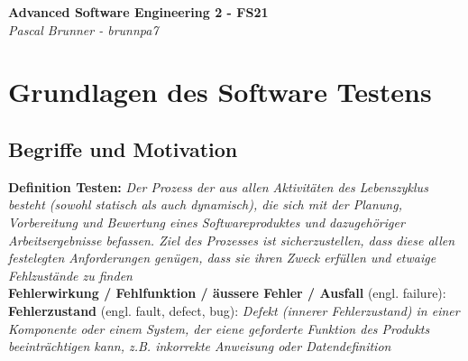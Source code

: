 \documentclass{report}
\newenvironment{Figure}
	{\par\medskip\noindent\minipage{\linewidth}}
	{\endminipage\par\medskip}
\theoremstyle{definition}
\theoremstyle{example}
\begin{document}
\begin{titlepage}
   \begin{center}
      \Large\textbf{Advanced Software Engineering 2 - FS21}\\
      \large\textit{Pascal Brunner - brunnpa7}
   \end{center}
\end{titlepage}


\tableofcontents

\newpage

\chapter{Grundlagen des Software Testens}

\section{Begriffe und Motivation}

\textbf{Definition Testen:} \textit{Der Prozess der aus allen Aktivitäten des Lebenszyklus besteht (sowohl statisch als auch dynamisch), 
die sich mit der Planung, Vorbereitung und Bewertung eines Softwareproduktes und dazugehöriger Arbeitsergebnisse befassen. Ziel des Prozesses ist sicherzustellen, 
dass diese allen festelegten Anforderungen genügen, dass sie ihren Zweck erfüllen und etwaige Fehlzustände zu finden}\\

\textbf{Fehlerwirkung / Fehlfunktion / äussere Fehler / Ausfall} (engl. failure): \\

\textbf{Fehlerzustand} (engl. fault, defect, bug): \textit{Defekt (innerer Fehlerzustand) in einer Komponente oder einem System, der eiene geforderte Funktion des Produkts beeinträchtigen kann, z.B. inkorrekte Anweisung oder Datendefinition}\\
\end{document}
